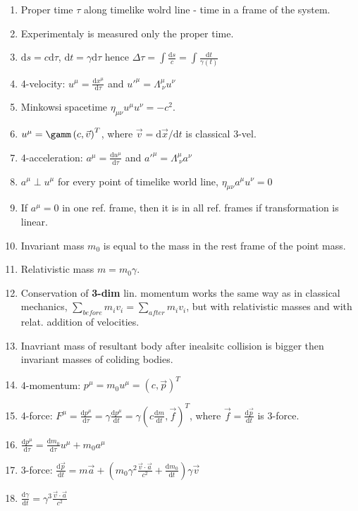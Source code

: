 \documentclass{article}
\renewcommand\d{\mathrm d}
\begin{document}
\begin{multicols}{3}
    \begin{enumerate}
        \item Proper time $\tau$ along timelike wolrd line - time in a frame of the system.
        \item Experimentaly is measured only the proper time.
        \item $\d s=c\d\tau$, $\d t=\gamma\d\tau$ hence $\Delta\tau=\int\frac{\d s}{c}=\int\frac{\d t}{\gamma(t)}$
        \item 4-velocity: $u^\mu=\frac{\d x^\mu}{\d\tau}$ and $u'^\mu=\Lambda^\mu_{~\nu}u^\nu$
        \item Minkowsi spacetime $\eta_{\mu\nu}u^\mu u^\nu=-c^2$.
        \item $u^\mu=\gamm\left(c,\vec v\right)^T$, where $\vec v=\d\vec x/\d t$ is classical 3-vel.
        \item 4-acceleration: $a^\mu=\frac{\d u^\mu}{\d\tau}$ and $a'^\mu=\Lambda^\mu_{~\nu}a^\nu$
        \item $a^\mu\perp u^\mu$ for every point of timelike world line, $\eta_{\mu\nu}a^\mu u^\nu=0$
        \item If $a^\mu=0$ in one ref. frame, then it is in all ref. frames if transformation is linear.
        \item Invariant mass $m_0$ is equal to the mass in the rest frame of the point mass.
        \item Relativistic mass $m=m_0\gamma$.
        \item Conservation of \textbf{3-dim} lin. momentum works the same way as in classical mechanics, $\sum_{before} m_iv_i=\sum_{after} m_iv_i$, but with relativistic masses and with relat. addition of velocities.
        \item Inavriant mass of resultant body after inealsitc collision is bigger then invariant masses of coliding bodies.
        \item 4-momentum: $p^\mu=m_0u^\mu=\left(c,\vec p\right)^T$
        \item 4-force: $F^\mu=\frac{\d p^\mu}{\d\tau}=\gamma\frac{\d p^\mu}{\d t}=\gamma\left(c\frac{\d m}{\d t},\vec f\right)^T$, where $\vec f=\frac{\d\vec p}{\d t}$ is 3-force.
        \item $\frac{\d p^\mu}{\d\tau}=\frac{\d m_0}{\d\tau}u^\mu+m_0a^\mu$
        \item 3-force: $\frac{\d\vec p}{\d t}=m\vec a+\left(m_0\gamma^2\frac{\vec v\cdot\vec a}{c^2}+\frac{\d m_0}{\d t}\right)\gamma\vec v$
        \item $\frac{\d\gamma}{\d t}=\gamma^3\frac{\vec v\cdot\vec a}{c^2}$

\end{enumerate}
\end{multicols}
\end{document}
